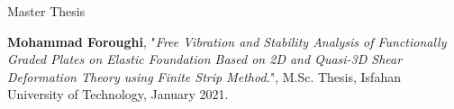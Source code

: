 \begin{cvskills}
  \cvskill 
  {Master Thesis} %
    {
    		\item \textbf{Mohammad Foroughi}, "\textit{Free Vibration and Stability Analysis of Functionally Graded Plates on Elastic Foundation Based on 2D and Quasi-3D Shear Deformation Theory using Finite Strip Method.}", M.Sc. Thesis, Isfahan University of Technology, January 2021.
  } %
 \end{cvskills}
